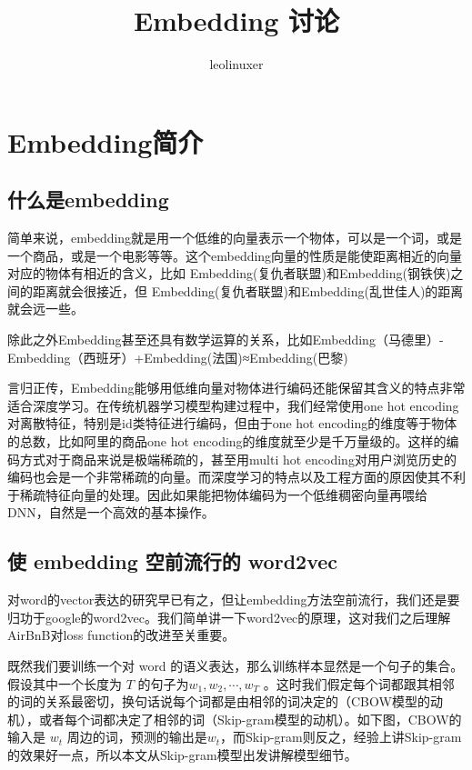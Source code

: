 \documentclass[12pt]{article}
\title{Embedding 讨论}
\author{leolinuxer}
\begin{document}
\maketitle
\tableofcontents

\section{Embedding简介\cite{Embedding_From_Word2Vec_To_Item2Vec}}
\subsection{什么是embedding}
简单来说，embedding就是用一个低维的向量表示一个物体，可以是一个词，或是一个商品，或是一个电影等等。这个embedding向量的性质是能使距离相近的向量对应的物体有相近的含义，比如 Embedding(复仇者联盟)和Embedding(钢铁侠)之间的距离就会很接近，但 Embedding(复仇者联盟)和Embedding(乱世佳人)的距离就会远一些。

除此之外Embedding甚至还具有数学运算的关系，比如Embedding（马德里）-Embedding（西班牙）+Embedding(法国)≈Embedding(巴黎)

言归正传，Embedding能够用低维向量对物体进行编码还能保留其含义的特点非常适合深度学习。在传统机器学习模型构建过程中，我们经常使用one hot encoding对离散特征，特别是id类特征进行编码，但由于one hot encoding的维度等于物体的总数，比如阿里的商品one hot encoding的维度就至少是千万量级的。这样的编码方式对于商品来说是极端稀疏的，甚至用multi hot encoding对用户浏览历史的编码也会是一个非常稀疏的向量。而深度学习的特点以及工程方面的原因使其不利于稀疏特征向量的处理。因此如果能把物体编码为一个低维稠密向量再喂给DNN，自然是一个高效的基本操作。

\subsection{使 embedding 空前流行的 word2vec}
对word的vector表达的研究早已有之，但让embedding方法空前流行，我们还是要归功于google的word2vec。我们简单讲一下word2vec的原理，这对我们之后理解AirBnB对loss function的改进至关重要。

既然我们要训练一个对 word 的语义表达，那么训练样本显然是一个句子的集合。假设其中一个长度为 $T$ 的句子为$w_1, w_2, \cdots, w_T$ 。这时我们假定每个词都跟其相邻的词的关系最密切，换句话说每个词都是由相邻的词决定的（CBOW模型的动机），或者每个词都决定了相邻的词（Skip-gram模型的动机）。如下图，CBOW的输入是 $w_t$ 周边的词，预测的输出是$w_t$，而Skip-gram则反之，经验上讲Skip-gram的效果好一点，所以本文从Skip-gram模型出发讲解模型细节。
\end{document}
